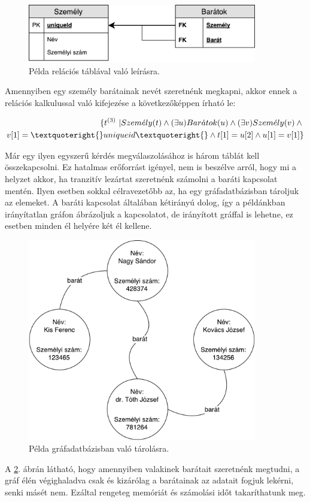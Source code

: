 \begin{figure}[H]
	\centering
	\includegraphics[width=100mm]{figures/RelaciosPelda.pdf}
	\caption{Példa relációs táblával való leírásra.}
	\label{fig:relaciosPelda}
\end{figure}

Amennyiben egy személy barátainak nevét szeretnénk megkapni, akkor ennek a relációs kalkulussal való kifejezése a következőképpen írható le:

\begin{equation}
\begin{split}
\{t^{(3)}\ | Szem\acute{e}ly(t) \wedge{} (\exists{}u)Bar\acute{a}tok(u) \wedge{} (\exists{}v)Szem\acute{e}ly(v) \wedge{} \\ v[1] = \textquoteright{}uniqueid\textquoteright{} \wedge{} 
t[1]=u[2] \wedge{}u[1]=v[1]      \}
\end{split}
\end{equation}

Már egy ilyen egyszerű kérdés megválaszolásához is három táblát kell összekapcsolni. Ez hatalmas erőforrást igényel, nem is beszélve arról, hogy mi a helyzet akkor, ha tranzitív lezártat szeretnénk számolni a baráti kapcsolat mentén. Ilyen esetben sokkal célravezetőbb az, ha egy gráfadatbázisban tároljuk az elemeket. A baráti kapcsolat általában kétirányú dolog, így a példánkban irányítatlan gráfon ábrázoljuk a kapcsolatot, de irányított gráffal is lehetne, ez esetben minden él helyére két él kellene.

\begin{figure}[H]
	\centering
	\includegraphics[width=100mm]{figures/GrafadatbazisPelda.pdf}
	\caption{Példa gráfadatbázisban való tárolásra.}
	\label{fig:grafPelda}
\end{figure}

A \ref{fig:grafPelda}. ábrán látható, hogy amennyiben valakinek barátait szeretnénk megtudni, a gráf élén végighaladva csak és kizárólag a barátainak az adatait fogjuk lekérni, senki másét nem. Ezáltal rengeteg memóriát és számolási időt takaríthatunk meg.